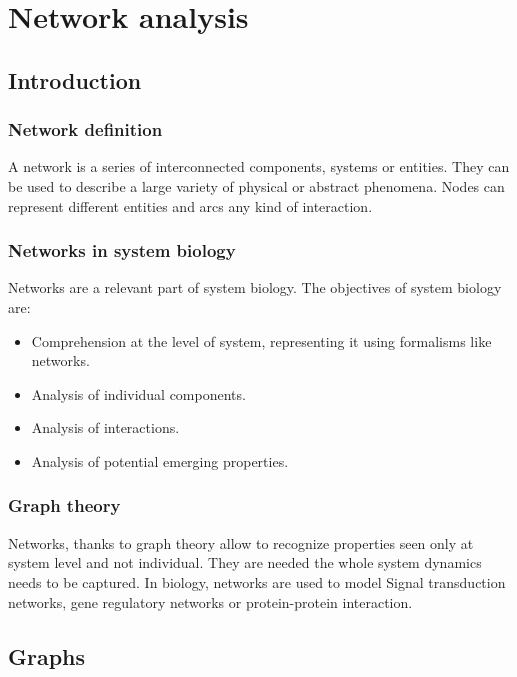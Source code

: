 \graphicspath{{chapters/07/images/}}
\chapter{Network analysis}

\section{Introduction}

	\subsection{Network definition}
	A network is a series of interconnected components, systems or entities.
	They can be used to describe a large variety of physical or abstract phenomena.
	Nodes can represent different entities and arcs any kind of interaction.

	\subsection{Networks in system biology}
	Networks are a relevant part of system biology.
	The objectives of system biology are:

	\begin{multicols}{2}
		\begin{itemize}
			\item Comprehension at the level of system, representing it using formalisms like networks.
			\item Analysis of individual components.
			\item Analysis of interactions.
			\item Analysis of potential emerging properties.
		\end{itemize}
	\end{multicols}

	\subsection{Graph theory}
	Networks, thanks to graph theory allow to recognize properties seen only at system level and not individual.
	They are needed the whole system dynamics needs to be captured.
	In biology, networks are used to model Signal transduction networks, gene regulatory networks or protein-protein interaction.

\section{Graphs}

